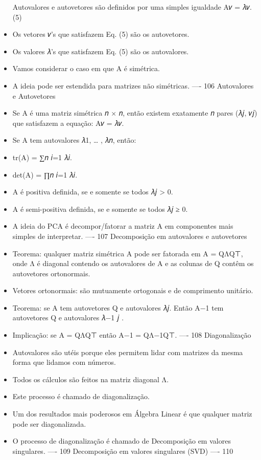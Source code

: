 \documentclass[
]{article}
\begin{document}
\begin{itemize}
  Autovalores e autovetores são definidos por uma simples igualdade A𝑣 =
  𝜆𝑣. (5)
\item
  Os vetores 𝑣's que satisfazem Eq. (5) são os autovetores.
\item
  Os valores 𝜆's que satisfazem Eq. (5) são os autovalores.
\item
  Vamos considerar o caso em que A é simétrica.
\item
  A ideia pode ser estendida para matrizes não simétricas. ---- 106
  Autovalores e Autovetores
\item
  Se A é uma matriz simétrica 𝑛 × 𝑛, então existem exatamente 𝑛 pares
  (𝜆𝑗, 𝑣𝑗) que satisfazem a equação: A𝑣 = 𝜆𝑣.
\item
  Se A tem autovalores 𝜆1, \ldots{} , 𝜆𝑛, então:
\item
  tr(A) = ∑𝑛 𝑖=1 𝜆𝑖.
\item
  det(A) = ∏𝑛 𝑖=1 𝜆𝑖.
\item
  A é positiva definida, se e somente se todos 𝜆𝑗 \textgreater{} 0.
\item
  A é semi-positiva definida, se e somente se todos 𝜆𝑗 ≥ 0.
\item
  A ideia do PCA é decompor/fatorar a matriz A em componentes mais
  simples de interpretar. ---- 107 Decomposição em autovalores e
  autovetores
\item
  Teorema: qualquer matriz simétrica A pode ser fatorada em A = QΛQ⊤,
  onde Λ é diagonal contendo os autovalores de A e as colunas de Q
  contêm os autovetores ortonormais.
\item
  Vetores ortonormais: são mutuamente ortogonais e de comprimento
  unitário.
\item
  Teorema: se A tem autovetores Q e autovalores 𝜆𝑗. Então A−1 tem
  autovetores Q e autovalores 𝜆−1 𝑗 .
\item
  Implicação: se A = QΛQ⊤ então A−1 = QΛ−1Q⊤. ---- 108 Diagonalização
\item
  Autovalores são utéis porque eles permitem lidar com matrizes da mesma
  forma que lidamos com números.
\item
  Todos os cálculos são feitos na matriz diagonal Λ.
\item
  Este processo é chamado de diagonalização.
\item
  Um dos resultados mais poderosos em Álgebra Linear é que qualquer
  matriz pode ser diagonalizada.
\item
  O processo de diagonalização é chamado de Decomposição em valores
  singulares. ---- 109 Decomposição em valores singulares (SVD) ---- 110

\end{itemize}
\end{document}
